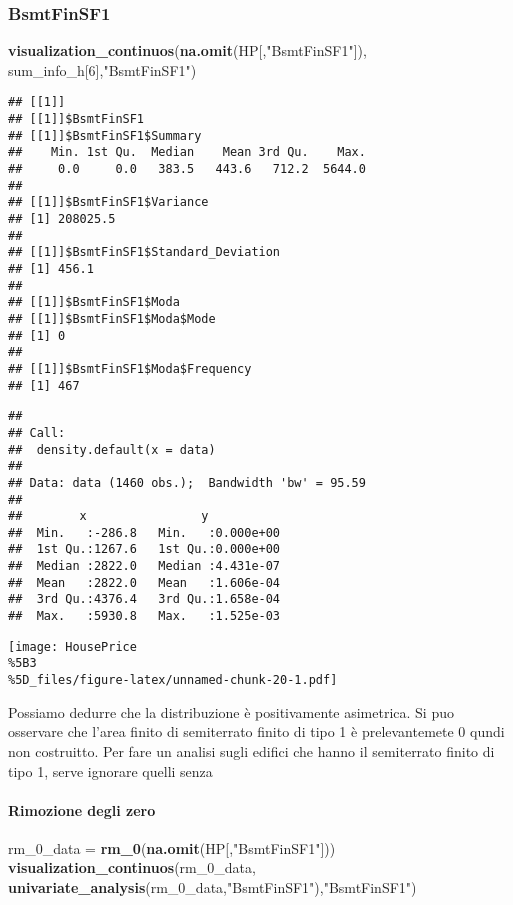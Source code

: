 \documentclass[
]{article}
\newenvironment{Shaded}{\begin{snugshade}}{\end{snugshade}}
\newcommand{\DecValTok}[1]{\textcolor[rgb]{0.00,0.00,0.81}{#1}}
\newcommand{\FunctionTok}[1]{\textcolor[rgb]{0.13,0.29,0.53}{\textbf{#1}}}
\newcommand{\NormalTok}[1]{#1}
\newcommand{\OtherTok}[1]{\textcolor[rgb]{0.56,0.35,0.01}{#1}}
\newcommand{\StringTok}[1]{\textcolor[rgb]{0.31,0.60,0.02}{#1}}
\begin{document}
\subsubsection{BsmtFinSF1}\label{bsmtfinsf1}

\begin{Shaded}
\begin{Highlighting}[]
\FunctionTok{visualization\_continuos}\NormalTok{(}\FunctionTok{na.omit}\NormalTok{(HP[,}\StringTok{"BsmtFinSF1"}\NormalTok{]), sum\_info\_h[}\DecValTok{6}\NormalTok{],}\StringTok{"BsmtFinSF1"}\NormalTok{)}
\end{Highlighting}
\end{Shaded}

\begin{verbatim}
## [[1]]
## [[1]]$BsmtFinSF1
## [[1]]$BsmtFinSF1$Summary
##    Min. 1st Qu.  Median    Mean 3rd Qu.    Max. 
##     0.0     0.0   383.5   443.6   712.2  5644.0 
## 
## [[1]]$BsmtFinSF1$Variance
## [1] 208025.5
## 
## [[1]]$BsmtFinSF1$Standard_Deviation
## [1] 456.1
## 
## [[1]]$BsmtFinSF1$Moda
## [[1]]$BsmtFinSF1$Moda$Mode
## [1] 0
## 
## [[1]]$BsmtFinSF1$Moda$Frequency
## [1] 467
\end{verbatim}

\begin{verbatim}
## 
## Call:
##  density.default(x = data)
## 
## Data: data (1460 obs.);  Bandwidth 'bw' = 95.59
## 
##        x                y            
##  Min.   :-286.8   Min.   :0.000e+00  
##  1st Qu.:1267.6   1st Qu.:0.000e+00  
##  Median :2822.0   Median :4.431e-07  
##  Mean   :2822.0   Mean   :1.606e-04  
##  3rd Qu.:4376.4   3rd Qu.:1.658e-04  
##  Max.   :5930.8   Max.   :1.525e-03
\end{verbatim}

\texttt{[image: HousePrice\\\%5B3\\\%5D\_files/figure-latex/unnamed-chunk-20-1.pdf]}

Possiamo dedurre che la distribuzione è positivamente asimetrica. Si puo
osservare che l'area finito di semiterrato finito di tipo 1 è
prelevantemete 0 qundi non costruitto. Per fare un analisi sugli edifici
che hanno il semiterrato finito di tipo 1, serve ignorare quelli senza

\paragraph{Rimozione degli zero}\label{rimozione-degli-zero-2}

\begin{Shaded}
\begin{Highlighting}[]
\NormalTok{rm\_0\_data }\OtherTok{=} \FunctionTok{rm\_0}\NormalTok{(}\FunctionTok{na.omit}\NormalTok{(HP[,}\StringTok{"BsmtFinSF1"}\NormalTok{]))}
\FunctionTok{visualization\_continuos}\NormalTok{(rm\_0\_data, }\FunctionTok{univariate\_analysis}\NormalTok{(rm\_0\_data,}\StringTok{"BsmtFinSF1"}\NormalTok{),}\StringTok{"BsmtFinSF1"}\NormalTok{)}
\end{Highlighting}
\end{Shaded}
\end{document}
